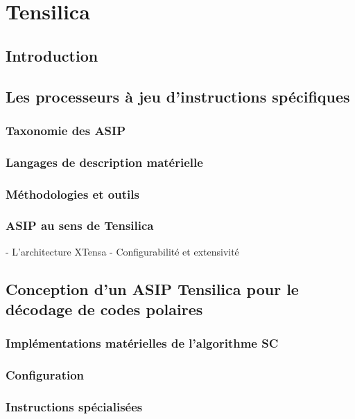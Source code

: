 \chapter{Tensilica} %


\vspace*{\fill}
\minitocTITI
\vspace*{\fill}
\newpage

\section*{Introduction}

\section{Les processeurs à jeu d'instructions spécifiques}

\subsection{Taxonomie des ASIP}
\subsection{Langages de description matérielle}
\subsection{Méthodologies et outils}
\subsection{ASIP au sens de Tensilica}

- L'architecture XTensa
- Configurabilité et extensivité


\section{Conception d'un ASIP Tensilica pour le décodage de codes polaires}

\subsection{Implémentations matérielles de l'algorithme SC}
\subsection{Configuration}
\subsection{Instructions spécialisées}
